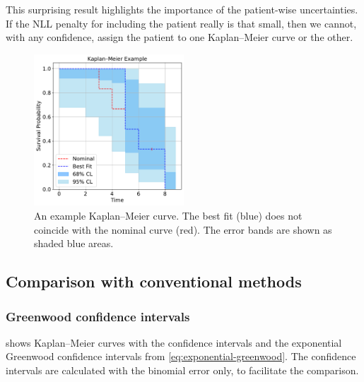 \documentclass[article]{jss}
\newcommand{\KM}{Kaplan--Meier} %
\begin{document}
This surprising result highlights the importance of the patient-wise uncertainties.  If the NLL penalty for including the patient really is that small, then we cannot, with any confidence, assign the patient to one \KM{} curve or the other.

\begin{figure}
  \centering
  \includegraphics[width=0.5\textwidth]{km_example.pdf}
  \caption{\label{fig:best-fit-vs-nominal} An example \KM{} curve.  The best fit (blue) does not coincide with the nominal curve (red).  The error bands are shown as shaded blue areas.}
\end{figure}

\subsection{Comparison with conventional methods}\label{sec:compare-to-conventional}

\subsubsection{Greenwood confidence intervals}\label{sec:compare-to-greenwood}

 shows \KM{} curves with the  confidence intervals and the exponential Greenwood confidence intervals from \cref{eq:exponential-greenwood}.  The  confidence intervals are calculated with the binomial error only, to facilitate the comparison.
\end{document}
